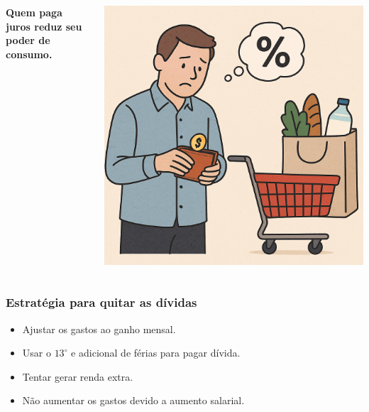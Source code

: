 \begin{frame}[c]
    \frametitle{}
    \begin{columns}
        \begin{column}{0.5\textwidth}
            \centering
            \textbf{\Large Quem paga juros reduz seu poder de consumo.}
        \end{column}
        \begin{column}{0.5\textwidth}
            \includegraphics[width=\textwidth]{../figuras/consumo2.png}
        \end{column}
    \end{columns}
\end{frame}



\begin{frame}[c]\frametitle{Estratégia para quitar as dívidas}
    \begin{itemize}
        \item Ajustar os gastos ao ganho mensal.
        \item Usar o $13^\circ$ e adicional de férias para pagar dívida.
        \item Tentar gerar renda extra.
        \item Não aumentar os gastos devido a aumento salarial.
    \end{itemize}
\end{frame}

